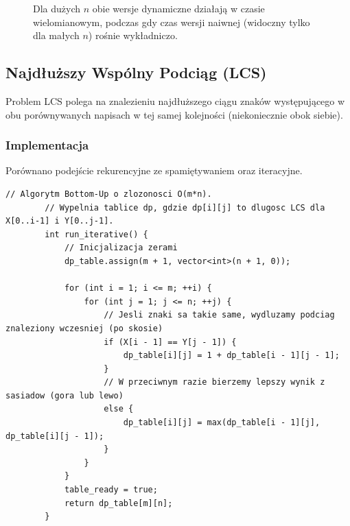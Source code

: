 \documentclass{article}
\begin{document}
	\begin{figure}[H]
		\centering
		\caption{Dla dużych $n$ obie wersje dynamiczne działają w czasie wielomianowym, podczas gdy czas wersji naiwnej (widoczny tylko dla małych $n$) rośnie wykładniczo.}
	\end{figure}
	
	\newpage
	\subsection{Najdłuższy Wspólny Podciąg (LCS)}
	Problem LCS polega na znalezieniu najdłuższego ciągu znaków występującego w obu porównywanych napisach w tej samej kolejności (niekoniecznie obok siebie).
	
	\subsubsection{Implementacja}
	Porównano podejście rekurencyjne ze spamiętywaniem oraz iteracyjne.
	\begin{lstlisting}[caption={Fragment implementacji: LCS (wersja iteracyjna)}]
		// Algorytm Bottom-Up o zlozonosci O(m*n).
		// Wypelnia tablice dp, gdzie dp[i][j] to dlugosc LCS dla X[0..i-1] i Y[0..j-1].
		int run_iterative() {
			// Inicjalizacja zerami
			dp_table.assign(m + 1, vector<int>(n + 1, 0));
			
			for (int i = 1; i <= m; ++i) {
				for (int j = 1; j <= n; ++j) {
					// Jesli znaki sa takie same, wydluzamy podciag znaleziony wczesniej (po skosie)
					if (X[i - 1] == Y[j - 1]) {
						dp_table[i][j] = 1 + dp_table[i - 1][j - 1];
					} 
					// W przeciwnym razie bierzemy lepszy wynik z sasiadow (gora lub lewo)
					else {
						dp_table[i][j] = max(dp_table[i - 1][j], dp_table[i][j - 1]);
					}
				}
			}
			table_ready = true;
			return dp_table[m][n];
		}
	\end{lstlisting}
	
\end{document}
